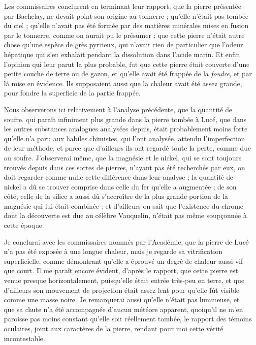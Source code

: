 \documentclass[a4paper, 12pt, oneside, french]{article}
\begin{document}
Les commissaires conclurent en terminant leur rapport, que la pierre présentée par Bachelay, ne devait point son origine au tonnerre ; qu'elle n'était pas tombée du ciel ; qu'elle n'avait pas été formée par des matières minérales mises en fusion par le tonnerre, comme on aurait pu le présumer ; que cette pierre n'était autre chose qu'une espèce de grès pyriteux, qui n'avait rien de particulier que l'odeur hépatique qui s'en exhalait pendant la dissolution dans l'acide marin. Et enfin l'opinion qui leur parut la plus probable, fut que cette pierre était couverte d'une petite couche de terre ou de gazon, et qu'elle avait été frappée de la \emph{foudre}, et par là mise en évidence. Ils supposaient aussi que la chaleur avait été assez grande, pour fondre la superficie de la partie frappée.

Nous observerons ici relativement à l'analyse précédente, que la quantité de soufre, qui paraît infiniment plus grande dans la pierre tombée à Lucé, que dans les autres substances analogues analysées depuis, était probablement moins forte qu'elle n'a paru aux habiles chimistes, qui l'ont analysée, attendu l'imperfection de leur méthode, et parce que d'ailleurs ils ont regardé toute la perte, comme due au soufre. J'observerai même, que la magnésie et le nickel, qui se sont toujours trouvés depuis dans ces sortes de pierres, n'ayant pas été recherchés par eux, on doit regarder comme nulle cette différence dans leur analyse ; la quantité de nickel a dû se trouver comprise dans celle du fer qu'elle a augmentée ; de son côté, celle de la silice a aussi dû s'accroître de la plus grande portion de la magnésie qui lui était combinée ; et d'ailleurs on sait que l'existence du chrome dont la découverte est due au célèbre Vauquelin, n'était pas même soupçonnée à cette époque.

Je conclurai avec les commissaires nommés par l'Académie, que la pierre de Lucé n'a pas été exposée à une longue chaleur, mais je regarde sa vitrification superficielle, comme démontrant qu'elle a éprouvé un degré de chaleur aussi vif que court. Il me paraît encore évident, d'après le rapport, que cette pierre est venue presque horizontalement, puisqu'elle était entrée très-peu en terre, et que d'ailleurs son mouvement de projection était assez lent pour qu'elle fût visible comme une masse noire. Je remarquerai aussi qu'elle n'était pas lumineuse, et que sa chute n'a été accompagnée d'aucun météore apparent, quoiqu'il ne m'en paroisse pas moins constant qu'elle soit réellement tombée, le rapport des témoins oculaires, joint aux caractères de la pierre, rendant pour moi cette vérité incontestable.
\end{document}
